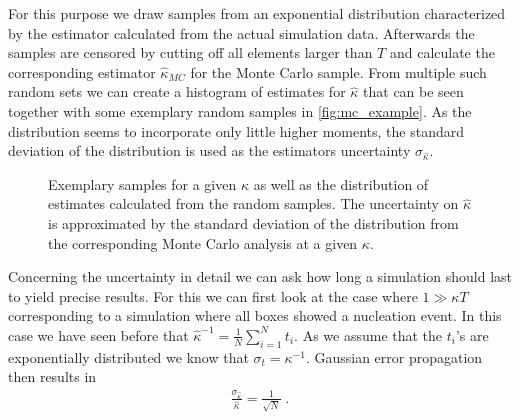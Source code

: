 For this purpose we draw samples from an exponential distribution characterized by the estimator calculated from the actual simulation data. Afterwards the samples are censored by cutting off all elements larger than $T$ and calculate the corresponding estimator $\hat{\kappa}_{MC}$ for the Monte Carlo sample. From multiple such random sets we can create a histogram of estimates for $\hat{\kappa}$ that can be seen together with some exemplary random samples in \autoref{fig:mc_example}. As the distribution seems to incorporate only little higher moments, the standard deviation of the distribution is used as the estimators uncertainty $\sigma_{\hat{\kappa}}$.\\

\begin{figure}[ht]
 \hspace{0.5cm}
\caption[Monte Carlo uncertainty estimation example]{Exemplary samples for a given $\kappa$ as well as the distribution of estimates calculated from the random samples. The uncertainty on $\hat{\kappa}$ is approximated by the standard deviation of the distribution from the corresponding Monte Carlo analysis at a given $\kappa$.}
\label{fig:mc_example}
\end{figure}
Concerning the uncertainty in detail we can ask how long a simulation should last to yield precise results. For this we can first look at the case where $1 \gg \kappa T$ corresponding to a simulation where all boxes showed a nucleation event. In this case we have seen before that $\hat{\kappa}^{-1} = \frac{1}{N} \sum_{i=1}^N t_i$. As we assume that the $t_i$'s are exponentially distributed we know that $\sigma_{t} = \kappa^{-1}$. Gaussian error propagation then results in
\begin{align}
\label{eqn:uncertainty_k_gg}
\frac{\sigma_{\hat{\kappa}}}{\hat{\kappa}} = \frac{1}{\sqrt{N}} \; \text{.}
\end{align}
